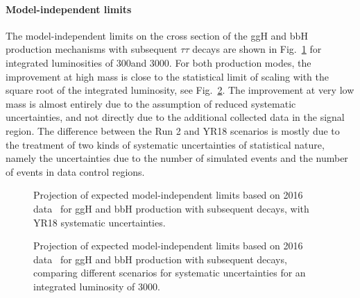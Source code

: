 \paragraph{Model-independent limits}
\label{sec:model_indep}

The model-independent limits on the cross section of the ggH and bbH production mechanisms with subsequent $\tau\tau$ decays are shown in Fig.~\ref{fig:model_indep} for 
integrated luminosities of 300\Uifb and 3000\Uifb.
For both production modes, the improvement at high mass is close to the statistical limit of scaling with the square root of the integrated luminosity, 
see Fig.~\ref{fig:model_indep2}. 
The improvement at very low mass is almost entirely due to the assumption of reduced systematic uncertainties, and not directly due to 
the additional collected data in the signal region. The difference between the Run 2 and YR18 scenarios is mostly due to the treatment 
of two kinds of systematic uncertainties of statistical nature, namely the uncertainties due to the number of simulated events and the number 
of events in data control regions.
%
\begin{figure}[htbp]
\begin{center}
\end{center}
\caption{Projection of expected model-independent limits based on 2016 data~\cite{HIG-17-020} for ggH and bbH production with subsequent \htt decays, with YR18 systematic uncertainties.}
\label{fig:model_indep}
\end{figure}
%
\begin{figure}[htbp]
\begin{center}
\end{center}
\caption{Projection of expected model-independent limits based on 2016 data~\cite{HIG-17-020} for ggH and bbH production with subsequent \htt decays, comparing different 
scenarios for systematic uncertainties for an integrated luminosity of 3000\Uifb.}
\label{fig:model_indep2}
\end{figure}
